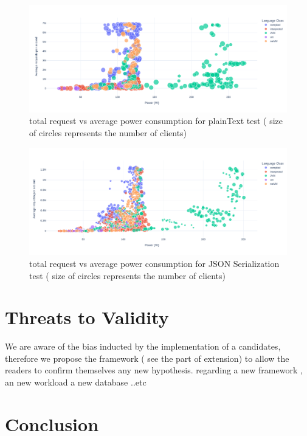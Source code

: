 \begin{figure}[hbt]
    \centering
    \includegraphics[width=
        \columnwidth]{imgs/power_requests_plaintext}
    \caption{total request vs average power consumption for plainText test ( size of circles represents the number of clients)}
    \label{fig:power_requests_plaintext}
\end{figure}

\begin{figure}[hbt]
    \centering
    \includegraphics[width=
        \columnwidth]{imgs/power_requests_json}
    \caption{total request vs average power consumption for JSON Serialization test ( size of circles represents the number of clients)}
    \label{fig:power_requests_json}
\end{figure}
\section{Threats to Validity}
We are aware of the bias inducted by the implementation of a candidates, therefore we propose  the framework ( see the part of extension) to allow the readers to confirm themselves any new hypothesis. regarding a new framework , an new workload a new database ..etc

\section{Conclusion}

